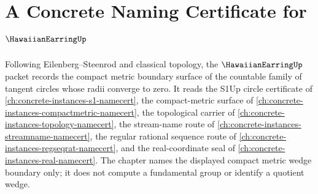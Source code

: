 \chapter{A Concrete Naming Certificate for $\HawaiianEarringUp$}
\label{ch:concrete-instances-hawaiian-earring-namecert}

Following Eilenberg--Steenrod and classical topology, the $\HawaiianEarringUp$ packet records the compact metric boundary surface of the countable family of tangent circles whose radii converge to zero. It reads the S1Up circle certificate of \autoref{ch:concrete-instances-s1-namecert}, the compact-metric surface of \autoref{ch:concrete-instances-compactmetric-namecert}, the topological carrier of \autoref{ch:concrete-instances-topology-namecert}, the stream-name route of \autoref{ch:concrete-instances-streamname-namecert}, the regular rational sequence route of \autoref{ch:concrete-instances-regseqrat-namecert}, and the real-coordinate seal of \autoref{ch:concrete-instances-real-namecert}. The chapter names the displayed compact metric wedge boundary only; it does not compute a fundamental group or identify a quotient wedge.

